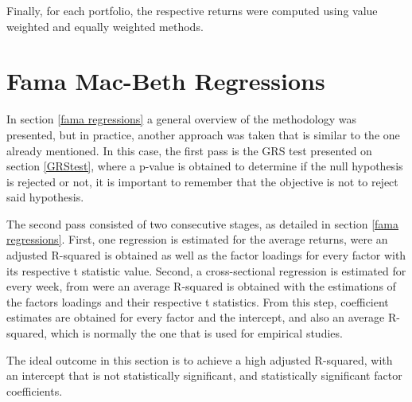 Finally, for each portfolio, the respective returns were computed using value weighted and equally weighted methods.

\section{Fama Mac-Beth Regressions}
In section \ref{fama regressions} a general overview of the methodology was presented, but in practice, another approach was taken that is similar to the one already mentioned. In this case, the first pass is the GRS test presented on section \ref{GRStest}, where a p-value is obtained to determine if the null hypothesis is rejected or not, it is important to remember that the objective is not to reject said hypothesis.

The second pass consisted of two consecutive stages, as detailed in section \ref{fama regressions}. First, one regression is estimated for the average returns, were an adjusted R-squared is obtained as well as the factor loadings for every factor with its respective t statistic value. Second, a cross-sectional regression is estimated for every week, from were an average R-squared is obtained with the estimations of the factors loadings and their respective t statistics. From this step, coefficient estimates are obtained for every factor and the intercept, and also an average R-squared, which is normally the one that is used for empirical studies.

The ideal outcome in this section is to achieve a high adjusted R-squared, with an intercept that is not statistically significant, and statistically significant factor coefficients.







 